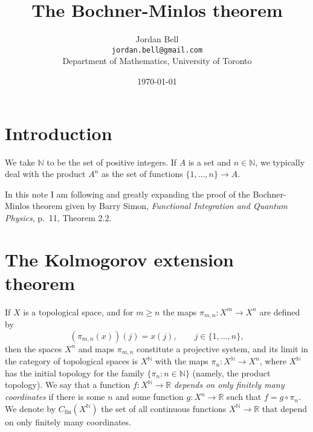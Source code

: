 \documentclass{article}
\theoremstyle{definition}
\begin{document}
\title{The Bochner-Minlos theorem}
\author{Jordan Bell\\ \texttt{jordan.bell@gmail.com}\\Department of Mathematics, University of Toronto}
\date{\today}

\maketitle

\section{Introduction}
We take $\mathbb{N}$ to be the set of positive integers.
 If $A$ is a set and $n \in \mathbb{N}$, we typically deal with the product $A^n$ as the set of functions $\{1,\ldots,n\} \to A$.

In this note I am following and greatly expanding the proof of the Bochner-Minlos theorem given by Barry Simon, {\em Functional Integration and Quantum Physics}, p.~11, Theorem 2.2.

\section{The Kolmogorov extension theorem}
If $X$ is a topological space,  and  for $m \geq n$ the maps $\pi_{m,n}:X^m \to X^n$ are defined by
\[
(\pi_{m,n}(x))(j)=
x(j), \qquad j \in \{1,\ldots,n\},
\]
 then the spaces
$X^n$ and maps $\pi_{m,n}$ constitute a projective system, and its  limit in the category of topological spaces is $X^\mathbb{N}$ with the maps $\pi_n:X^\mathbb{N} \to X^n$,
where $X^\mathbb{N}$ has the initial topology for the family $\{\pi_n: n \in \mathbb{N}\}$ (namely,  the product topology).
We say that a function $f:X^\mathbb{N} \to \mathbb{R}$ {\em depends on only finitely many coordinates} if there is some $n$ and some function $g:X^n \to \mathbb{R}$ such that
$f=g \circ \pi_n$. We denote by
$C_{\mathrm{fin}}(X^\mathbb{N})$ the set of all continuous functions $X^\mathbb{N} \to \mathbb{R}$ that depend on only finitely many coordinates.
\end{document}
